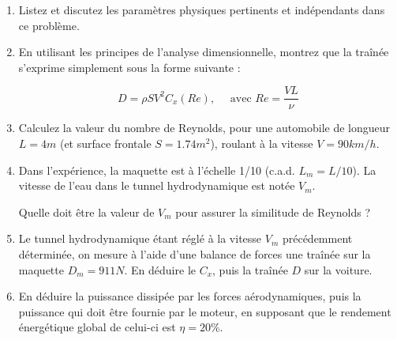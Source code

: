 \begin{enumerate}
\item Listez et discutez les paramètres physiques pertinents et indépendants dans ce problème.  


\item En utilisant les principes de l'analyse dimensionnelle, montrez que la traînée s'exprime simplement sous la forme suivante :

$$ 
D = \rho S V^2 C_x( Re),  \quad \mbox{ avec } Re = \frac{V L}{\nu}
$$



\item Calculez la valeur du nombre de Reynolds, pour une automobile de longueur $L = 4m$ (et surface frontale $S = 1.74 m^2$), roulant à la vitesse $V= 90 km/h$. 


\item Dans l'expérience, la maquette est à l'échelle 1/10 (c.a.d. $L_m = L/10$). La vitesse de l'eau dans le tunnel hydrodynamique est notée $V_m$.

Quelle doit être la valeur de $V_m$ pour assurer la similitude de Reynolds ?


\item 
Le tunnel hydrodynamique étant réglé à la vitesse $V_m$ précédemment déterminée, 
on mesure à l'aide d'une balance de forces une traînée sur la maquette $D_m = 911 N$.
En déduire le $C_x$, puis la traînée $D$ sur la voiture.


\item En déduire la puissance dissipée par les forces aérodynamiques, puis la puissance qui doit être fournie par le moteur, en supposant que le rendement énergétique global de celui-ci est $\eta = 20 \%$.


\end{enumerate}
 
